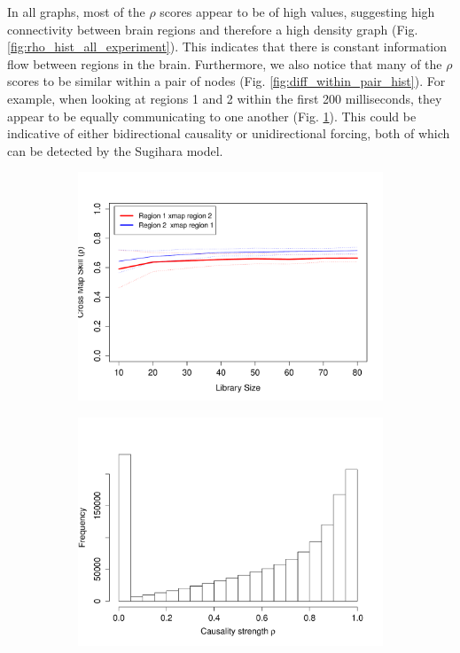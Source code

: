 \documentclass[journal,12pt,onecolumn,draftclsnofoot]{IEEEtran}  %
\begin{document}
In all graphs, most of the $\rho$ scores appear to be of high values, suggesting high connectivity between brain regions and therefore a high density graph (Fig. \ref{fig:rho_hist_all_experiment}). This indicates that there is constant information flow between regions in the brain. Furthermore, we also notice that many of the $\rho$ scores to be similar within a pair of nodes (Fig. \ref{fig:diff_within_pair_hist}). For example, when looking at regions 1 and 2 within the first 200 milliseconds, they appear to be equally communicating to one another (Fig. \ref{fig:sample_pair_causality_plot}). This could be indicative of either bidirectional causality or unidirectional forcing, both of which can be detected by the Sugihara model.

\begin{figure}[H]  
  \centering
  \begin{subfigure}{0.45\textwidth}
    \includegraphics[width=\linewidth]{figures/sample_pairwise_causality_measure.pdf}
    \caption{}
    \label{fig:sample_pair_causality_plot}
  \end{subfigure}
  \begin{subfigure}{0.45\textwidth}
    \centering
    \includegraphics[width=1\linewidth]{figures/rho_hist_all_experiment.pdf}

\end{subfigure}
\end{figure}
\end{document}
